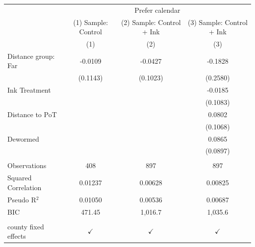 
\begingroup
\centering
\begin{tabular}{lccc}
   \toprule
    & \multicolumn{3}{c}{Prefer calendar}\\
                        & (1) Sample: Control & (2) Sample: Control + Ink & (3) Sample: Control + Ink \\   
                        & (1)                 & (2)                       & (3)\\  
   \midrule 
   Distance group: Far  & -0.0109             & -0.0427                   & -0.1828\\   
                        & (0.1143)            & (0.1023)                  & (0.2580)\\   
   Ink Treatment        &                     &                           & -0.0185\\   
                        &                     &                           & (0.1083)\\   
   Distance to PoT      &                     &                           & 0.0802\\   
                        &                     &                           & (0.1068)\\   
   Dewormed             &                     &                           & 0.0865\\   
                        &                     &                           & (0.0897)\\   
    \\
   Observations         & 408                 & 897                       & 897\\  
   Squared Correlation  & 0.01237             & 0.00628                   & 0.00825\\  
   Pseudo R$^2$         & 0.01050             & 0.00536                   & 0.00687\\  
   BIC                  & 471.45              & 1,016.7                   & 1,035.6\\  
    \\
   county fixed effects & $\checkmark$        & $\checkmark$              & $\checkmark$\\   
   \bottomrule
\end{tabular}
\par\endgroup


